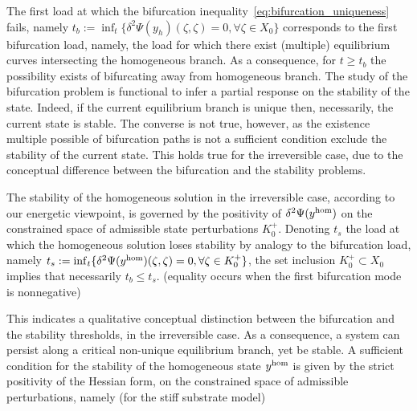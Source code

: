 \documentclass[10pt]{article}
\begin{document}
The first load at which the bifurcation inequality~\eqref{eq:bifurcation_uniqueness} fails, namely $t_b:=\inf_t \{\delta^2 \Psi(y_h)(\zeta, \zeta) =0, \forall \zeta \in X_0 \}$ corresponds to the first  bifurcation load, namely, the load for which there exist (multiple) equilibrium curves intersecting the homogeneous branch. As a consequence, for $t\geq t_b$  the possibility exists of bifurcating away from homogeneous branch. The study of the bifurcation problem is functional to infer a partial response on the stability of the state. Indeed, if the current equilibrium branch is unique then, necessarily, the current state is stable. The converse is not true, however, as the existence multiple possible of bifurcation paths is not a sufficient condition exclude the stability of the current state. This holds true for the irreversible case, due to the conceptual difference between the bifurcation and the stability problems.

The stability of the homogeneous solution in the irreversible case, according to our energetic viewpoint, is governed by the positivity of $\delta^2 \Psi(y^{\text{hom}})$ on the constrained space of admissible state perturbations $K^+_0$.
%
Denoting $t_s$ the load at which the homogeneous solution loses stability by analogy to the bifurcation load, namely $t_s: = \inf_t \{\delta^2 \Psi(y^{\text{hom}})(\zeta, \zeta) =0, \forall \zeta \in K^+_0 \}$, the set inclusion $K^+_0 \subset X_0$ implies that necessarily $t_b \leq t_s$. (equality occurs when the first bifurcation mode is nonnegative)

This indicates a qualitative conceptual distinction between the bifurcation and the stability thresholds, in the irreversible case. As a consequence, a system can persist along a critical non-unique equilibrium branch, yet be stable. 
A sufficient condition for the stability of the homogeneous state $y^{\text{hom}}$ is given by the strict positivity  of the Hessian form, on the constrained space of admissible perturbations, namely (for the stiff substrate model)
\end{document}
